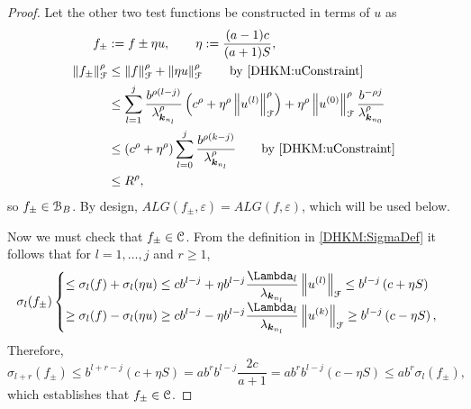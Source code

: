 \documentclass[USenglish]{article}
\theoremstyle{dgthm}
\theoremstyle{dgthm}
\theoremstyle{dgthm}
\theoremstyle{dgthm}
\theoremstyle{dgdef}
\newcommand{\norm}[2][{}]{\ensuremath{\left \lVert #2 \right \rVert}_{#1}}
\begin{document}
\begin{proof}
Let the other two test functions be constructed in terms of $u$ as 
\begin{align}
\nonumber
f_\pm & := f \pm \eta u, \qquad \eta : =  \frac {(a-1)c}{(a+1)S}, \\
\nonumber
\norm[\calF]{f_\pm}^\rho & \le \norm[\calF]{f}^\rho + \norm[\calF]{\eta u }^\rho \qquad \text{by \eqref{DHKM:uConstraint}} \\
& \nonumber 
\le \sum_{l=1}^j \frac{ b^{\rho(l-j)}}{\lambda^\rho_{\bsk_{n_l}}} \left(c^\rho+ \eta^\rho \norm[\calF]{u^{(l)}}^\rho\right) + \eta^\rho \norm[\calF]{u^{(0)}}^\rho \frac{b^{-\rho j}}{\lambda_{\bsk_{n_0}}^\rho}\\
\nonumber
& \le  \left(c^\rho+ \eta^\rho \right) \sum_{l=0}^j \frac{ b^{\rho(k-j)}}{\lambda^\rho_{\bsk_{n_l}}}  \qquad \text{by \eqref{DHKM:uConstraint}}\\
& \nonumber 
\le R^{\rho},
\end{align} 
so $f_{\pm} \in {\mathcal{B}}_{B}$.  By design, $ALG(f_\pm,\varepsilon) = ALG(f,\varepsilon)$, which will be used below.


Now we must check that $f_\pm \in {\mathcal{C}}$. From the definition in \eqref{DHKM:SigmaDef} it follows that for $l = 1, \ldots, j$ and $r \ge 1$,
\begin{equation*}
\sigma_l(f_\pm)  \begin{cases} 
\displaystyle
\le \sigma_l(f) + \sigma_l(\eta u)\le 
c b^{l-j} + \eta b^{l-j}\frac{\Lambda_l}{\lambda_{\bsk_{n_l}}}\norm[\calF]{u^{(l)} }
\le b^{l-j}\left(c+ \eta S \right)
\\[1ex]
\displaystyle
\ge \sigma_l(f) - \sigma_l(\eta u)\ge 
c b^{l-j} - \eta b^{l-j} \frac{\Lambda_l}{\lambda_{\bsk_{n_l}}}\norm[\calF]{u^{(k)}  }
\ge b^{l-j}\left(c-\eta S\right) , 
\end{cases}
\end{equation*}
Therefore, 
\begin{equation*}
\sigma_{l+r}(f_\pm)
\le b^{l+r-j}(c+\eta S) = ab^r b^{l-j}\frac{2c}{a+1}
=ab^r b^{l-j}\left(c-\eta S \right) \le a b^r \sigma_{l}(f_\pm),
\end{equation*}
which establishes that $f_\pm \in {\mathcal{C}}$.


\end{proof}
\end{document}
